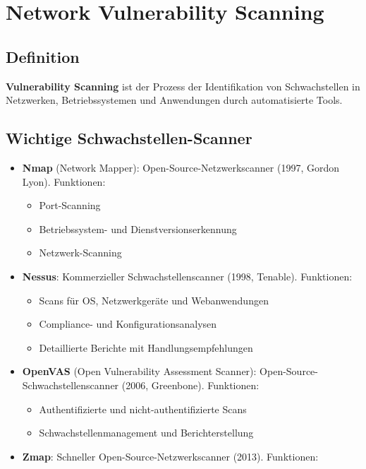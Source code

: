 \section{Network Vulnerability Scanning}

\subsection{Definition}
\textbf{Vulnerability Scanning} ist der Prozess der Identifikation von Schwachstellen in Netzwerken, Betriebssystemen und Anwendungen durch automatisierte Tools.

\subsection{Wichtige Schwachstellen-Scanner}
\begin{itemize}
    \item \textbf{Nmap} (Network Mapper): Open-Source-Netzwerkscanner (1997, Gordon Lyon). Funktionen:
    \begin{itemize}
        \item Port-Scanning
        \item Betriebssystem- und Dienstversionserkennung
        \item Netzwerk-Scanning
    \end{itemize}
    \item \textbf{Nessus}: Kommerzieller Schwachstellenscanner (1998, Tenable). Funktionen:
    \begin{itemize}
        \item Scans für OS, Netzwerkgeräte und Webanwendungen
        \item Compliance- und Konfigurationsanalysen
        \item Detaillierte Berichte mit Handlungsempfehlungen
    \end{itemize}
    \item \textbf{OpenVAS} (Open Vulnerability Assessment Scanner): Open-Source-Schwachstellenscanner (2006, Greenbone). Funktionen:
    \begin{itemize}
        \item Authentifizierte und nicht-authentifizierte Scans
        \item Schwachstellenmanagement und Berichterstellung
    \end{itemize}
    \item \textbf{Zmap}: Schneller Open-Source-Netzwerkscanner (2013). Funktionen:
    \begin{itemize}

\end{itemize}
\end{itemize}
